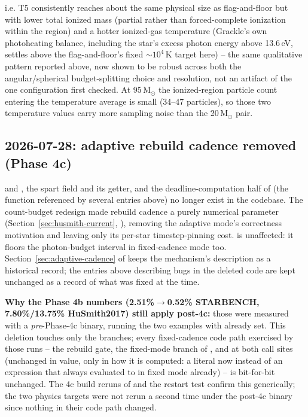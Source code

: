 i.e. T5 consistently reaches about the same physical size as flag-and-floor
but with lower total ionized mass (partial rather than forced-complete
ionization within the region) and a hotter ionized-gas temperature (Grackle's
own photoheating balance, including the star's excess photon energy above
13.6\,eV, settles above the flag-and-floor's fixed $\sim10^4\,$K target
here) -- the same qualitative pattern reported above, now shown to be
robust across both the angular/spherical budget-splitting choice and
resolution, not an artifact of the one configuration first checked. At
95\,M$_\odot$ the ionized-region particle count entering the temperature
average is small (34--47 particles), so those two temperature values
carry more sampling noise than the 20\,M$_\odot$ pair.

\subsection{2026-07-28: adaptive rebuild cadence removed (Phase 4c)}
\label{sec:phase4c-removal}

 and
, the 
spart field and its getter, and the deadline-computation half of
 (the
function referenced by several entries above) no longer exist in the
codebase. The count-budget redesign made rebuild cadence a purely
numerical parameter (Section~\ref{sec:husmith-current},
), removing the adaptive mode's correctness
motivation and leaving only its per-star timestep-pinning cost.
 is unaffected: it floors the
photon-budget interval in fixed-cadence mode too. Section~\ref{sec:adaptive-cadence}
of  keeps the mechanism's description as a
historical record; the entries above describing bugs in the deleted
code are kept unchanged as a record of what was fixed at the time.

\textbf{Why the Phase 4b numbers (2.51\%$\to$0.52\% STARBENCH,
7.80\%/13.75\% HuSmith2017) still apply post-4c:} those were measured
with a \emph{pre}-Phase-4c binary, running the two examples with
 already set. This deletion
touches only the  branches; every fixed-cadence code path exercised by those
runs -- the  rebuild gate, the
fixed-mode branch of ,
and  at both call sites (unchanged in value,
only in how it is computed: a literal now instead of an expression
that always evaluated to  in fixed mode already) -- is
bit-for-bit unchanged. The 4c build reruns of
 and the restart test confirm this
generically; the two physics targets were not rerun a second time
under the post-4c binary since nothing in their code path changed.

